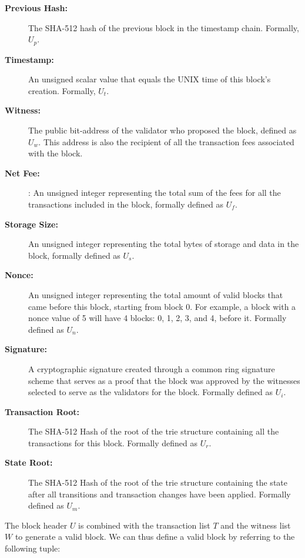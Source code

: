 \documentclass[conference]{IEEEtran}
\begin{document}
\begin{description}
\item[\textbf{Previous Hash:}]\hspace{40} The SHA-512 hash of the previous block in the timestamp chain. Formally, $U_p$.
\item[\textbf{Timestamp:}]\hspace{30} An unsigned scalar value that equals the UNIX time of this block's creation. Formally, $U_t$.
\item[\textbf{Witness:}]\hspace{10} The public bit-address of the validator who proposed the block, defined as $U_w$. This address is also the recipient of all the transaction fees associated with the block.
\item[\textbf{Net Fee:}]\hspace{10}: An unsigned integer representing the total sum of the fees for all the transactions included in the block, formally defined as $U_f$.
\item[\textbf{Storage Size:}]\hspace{30}  An unsigned integer representing the total bytes of storage and data in the block, formally defined as $U_s$.
\item[\textbf{Nonce:}]\hspace{5} An unsigned integer representing the total amount of valid blocks that came before this block, starting from block 0. For example, a block with a nonce value of 5 will have 4 blocks: 0, 1, 2, 3, and 4, before it. Formally defined as $U_n$.
\item[\textbf{Signature:}]\hspace{20} A cryptographic signature created through a common ring signature scheme that serves as a proof that the block was approved by the witnesses selected to serve as the validators for the block. Formally defined as $U_i$.
\item[\textbf{Transaction Root:}]\hspace{50} The SHA-512 Hash of the root of the trie structure containing all the transactions for this block. Formally defined as $U_r$.
\item[\textbf{State Root:}]\hspace{20} The SHA-512 Hash of the root of the trie structure containing the state after all transitions and transaction changes have been applied. Formally defined as $U_m$.
\end{description}


The block header $U$ is combined with the transaction list $T$ and the witness list $W$ to generate a valid block. We can thus define a valid block by referring to the following tuple:
\end{document}
